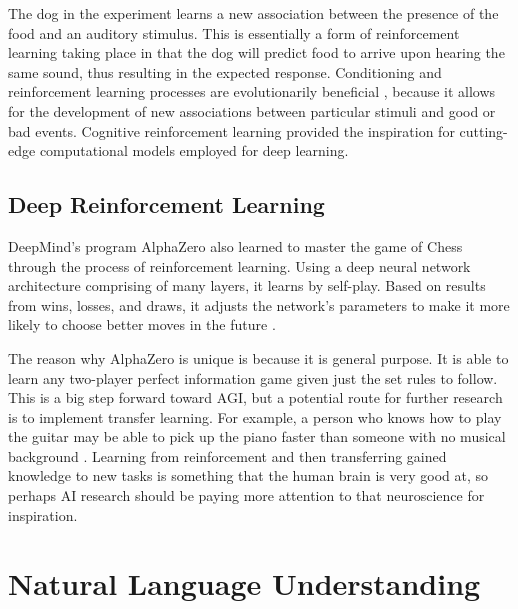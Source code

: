 \documentclass[12pt]{article}
\begin{document}
The dog in the experiment learns a new association between the presence of the food and an auditory stimulus. This is essentially a form of reinforcement learning taking place in that the dog will predict food to arrive upon hearing the same sound, thus resulting in the expected response. Conditioning and reinforcement learning processes are evolutionarily beneficial \cite{c18}, because it allows for the development of new associations between particular stimuli and good or bad events. Cognitive reinforcement learning provided the inspiration for cutting-edge computational models employed for deep learning. 

\subsection{Deep Reinforcement Learning}
DeepMind’s program AlphaZero also learned to master the game of Chess through the process of reinforcement learning. Using a deep neural network architecture comprising of many layers, it learns by self-play. Based on results from wins, losses, and draws, it adjusts the network’s parameters to make it more likely to choose better moves in the future \cite{c4}.

The reason why AlphaZero is unique is because it is general purpose. It is able to learn any two-player perfect information game given just the set rules to follow. This is a big step forward toward AGI, but a potential route for further research is to implement transfer learning. For example, a person who knows how to play the guitar may be able to pick up the piano faster than someone with no musical background \cite{c15}. Learning from reinforcement and then transferring gained knowledge to new tasks is something that the human brain is very good at, so perhaps AI research should be paying more attention to that neuroscience for inspiration.

\section{Natural Language Understanding}
\end{document}

